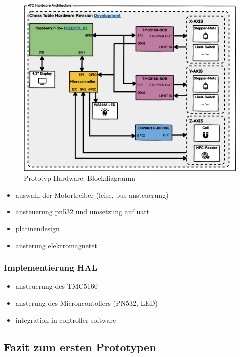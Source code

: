 \begin{figure}
\centering
\includegraphics{images/ATC_Hardware_Architecture_DK.png}
\caption{Prototyp Hardware: Blockdiagramm}
\end{figure}

\begin{itemize}
\tightlist
\item
  auswahl der Motortreiber (leise, bus ansteuerung)
\item
  ansteuerung pn532 und umsetzung auf uart
\item
  platinendesign
\item
  ansterung elektromagnetet
\end{itemize}

\hypertarget{implementierung-hal}{%
\subsubsection{Implementierung HAL}\label{implementierung-hal}}

\begin{itemize}
\tightlist
\item
  ansteuerung des TMC5160
\item
  ansterung des Microncontollers (PN532, LED)
\item
  integration in controller software
\end{itemize}

\hypertarget{fazit-zum-ersten-prototypen}{%
\subsection{Fazit zum ersten
Prototypen}\label{fazit-zum-ersten-prototypen}}


